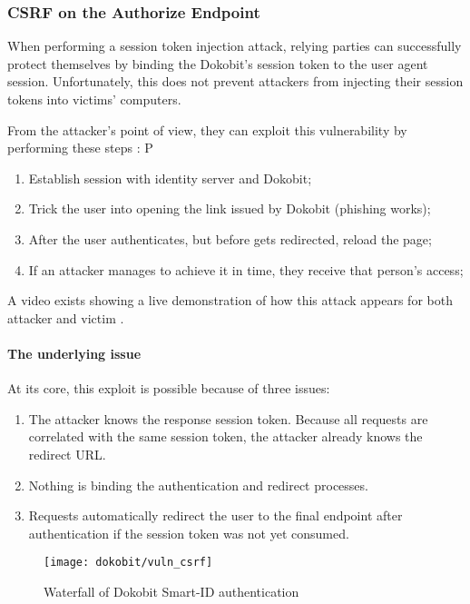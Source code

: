 \subsubsection{CSRF on the Authorize Endpoint}

When performing a session token injection attack, relying parties can successfully protect themselves by binding the Dokobit's session token to the user agent session. Unfortunately, this does not prevent attackers from injecting their session tokens into victims' computers.

From the attacker's point of view, they can exploit this vulnerability by performing these steps \cite{video-exploitdokobit}:
P
\begin{enumerate}
  \item Establish session with identity server and Dokobit;
  \item Trick the user into opening the link issued by Dokobit (phishing works);
  \item After the user authenticates, but before gets redirected, reload the page;
  \item If an attacker manages to achieve it in time, they receive that person's access;
\end{enumerate}

A video exists showing a live demonstration of how this attack appears for both attacker and victim \cite{video-exploitdokobit}.

\paragraph{The underlying issue}

At its core, this exploit is possible because of three issues: 

\begin{enumerate}
  \item The attacker knows the response session token. Because all requests are correlated with the same session token, the attacker already knows the redirect URL.
  \item Nothing is binding the authentication and redirect processes.
  \item Requests automatically redirect the user to the final endpoint after authentication if the session token was not yet consumed.
\end{enumerate}

\begin{figure}
  \centering
  \texttt{[image: dokobit/vuln\_csrf]}
  \caption{Waterfall of Dokobit Smart-ID authentication}
  \label{fig:dokobit-vuln-csrf}
\end{figure}

